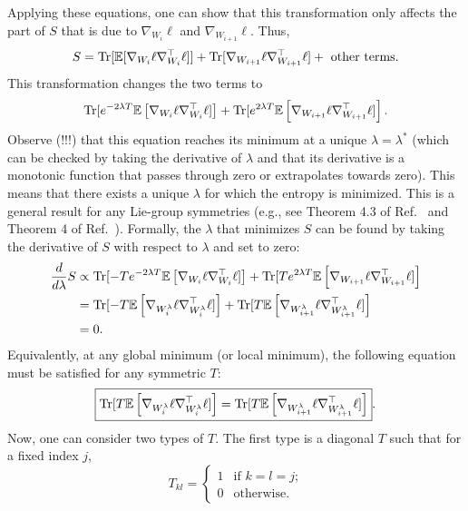 \documentclass[11pt]{article}
\theoremstyle{plain}
\newcommand{\E}{\mathbb{E}}
\newcommand{\Tr}{{\rm Tr}}
\begin{document}
Applying these equations, one can show that this transformation only affects the part of $S$ that is due to $\nabla_{W_i}\ell$ and $\nabla_{W_{i+1}}\ell$. Thus,
\begin{equation}
    S = \Tr[\E[\nabla_{W_i}\ell \nabla_{W_i}^\top\ell]]  +  \Tr[\nabla_{W_{i+1}}\ell \nabla_{W_{i+1}}^\top\ell]  + \text{ other terms.}
\end{equation}
This transformation changes the two terms to 
\begin{equation}\label{eq: two terms}
    \Tr[ e^{-2\lambda T}\E\left[\nabla_{W_i}\ell \nabla_{W_i}^\top\ell] \right]  +  \Tr[ e^{2\lambda T} \E\left[ \nabla_{W_{i+1}}\ell \nabla_{W_{i+1}}^\top\ell]\right].
\end{equation}
Observe (!!!) that this equation reaches its minimum at a unique $\lambda = \lambda^*$ (which can be checked by taking the derivative of $\lambda$ and that its derivative is a monotonic function that passes through zero or extrapolates towards zero). This means that there exists a unique $\lambda$ for which the entropy is minimized. This is a general result for any Lie-group symmetries (e.g., see Theorem 4.3 of Ref.~\cite{ziyin2024parameter} and Theorem 4 of Ref.~\cite{ziyin2025neural}). Formally, the $\lambda$ that minimizes $S$ can be found by taking the derivative of $S$ with respect to $\lambda$ and set to zero:
\begin{align}
    \frac{d}{d\lambda} S &\propto \Tr[ - T e^{-2\lambda T}\E\left[\nabla_{W_i}\ell \nabla_{W_i}^\top\ell] \right]  +   \Tr[ T e^{2\lambda T} \E\left[ \nabla_{W_{i+1}}\ell \nabla_{W_{i+1}}^\top\ell]\right] \\
    &=  \Tr[ - T \E\left[\nabla_{W_i^\lambda}\ell \nabla_{W_i^\lambda}^\top\ell] \right]  +   \Tr[ T\E\left[ \nabla_{W_{i+1}^\lambda}\ell \nabla_{W_{i+1}^\lambda}^\top\ell]\right]\\
    &=0.
\end{align}
Equivalently, at any global minimum (or local minimum), the following equation must be satisfied for any symmetric $T$:
\begin{equation}\label{eq: balance condition}
\boxed{
    \Tr[T \E\left[\nabla_{W_i^\lambda}\ell \nabla_{W_i^\lambda}^\top\ell] \right]  =   \Tr[ T\E\left[ \nabla_{W_{i+1}^\lambda}\ell \nabla_{W_{i+1}^\lambda}^\top\ell]\right]}.
\end{equation}
Now, one can consider two types of $T$. The first type is a diagonal $T$ such that for a fixed index $j$,
\begin{equation}
    T_{kl} = \begin{cases}
    1 & \text{if $k=l=j$;}\\
    0 & \text{otherwise.}
    \end{cases}
\end{equation}
\end{document}
